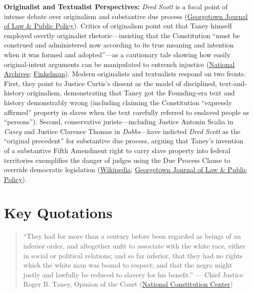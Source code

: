 \documentclass[12pt]{article}
\begin{document}
\textbf{Originalist and Textualist Perspectives:} \textit{Dred Scott} is a focal point of intense debate over originalism and substantive due process (\href{https://www.law.georgetown.edu/public-policy-journal/wp-content/uploads/sites/23/2018/10/16-2-Dred-Scott-Roe.pdf}{Georgetown Journal of Law \& Public Policy}). Critics of originalism point out that Taney himself employed overtly originalist rhetoric---insisting that the Constitution ``must be construed and administered now according to its true meaning and intention when it was formed and adopted''---as a cautionary tale showing how easily original-intent arguments can be manipulated to entrench injustice (\href{https://www.archives.gov/milestone-documents/dred-scott-v-sandford}{National Archives}; \href{https://studentorgs.kentlaw.iit.edu/cklawreview/wp-content/uploads/sites/3/vol82no1/Finkelman.pdf}{Finkelman}). Modern originalists and textualists respond on two fronts. First, they point to Justice Curtis's dissent as the model of disciplined, text-and-history originalism, demonstrating that Taney got the Founding-era text and history demonstrably wrong (including claiming the Constitution ``expressly affirmed'' property in slaves when the text carefully referred to enslaved people as ``persons''). Second, conservative jurists---including Justice Antonin Scalia in \textit{Casey} and Justice Clarence Thomas in \textit{Dobbs}---have indicted \textit{Dred Scott} as the ``original precedent'' for substantive due process, arguing that Taney's invention of a substantive Fifth Amendment right to carry slave property into federal territories exemplifies the danger of judges using the Due Process Clause to override democratic legislation (\href{https://en.wikipedia.org/wiki/Dred_Scott_v._Sandford}{Wikipedia}; \href{https://www.law.georgetown.edu/public-policy-journal/wp-content/uploads/sites/23/2018/10/16-2-Dred-Scott-Roe.pdf}{Georgetown Journal of Law \& Public Policy}).

\section{Key Quotations}

\begin{quote}
``They had for more than a century before been regarded as beings of an inferior order, and altogether unfit to associate with the white race, either in social or political relations; and so far inferior, that they had no rights which the white man was bound to respect; and that the negro might justly and lawfully be reduced to slavery for his benefit.'' --- Chief Justice Roger B. Taney, Opinion of the Court (\href{https://constitutioncenter.org/the-constitution/supreme-court-case-library/dred-scott-v-sandford}{National Constitution Center})
\end{quote}
\end{document}
